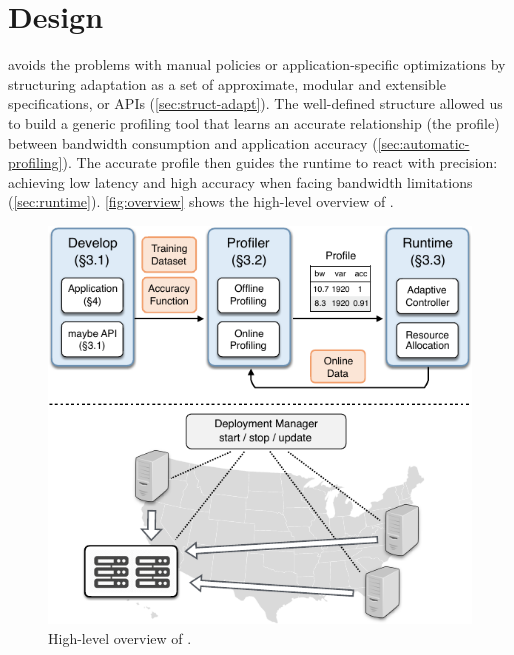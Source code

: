\section{\sysname{} Design}
\label{sec:system}

\sysname{} avoids the problems with manual policies or application-specific
optimizations by structuring adaptation as a set of approximate, modular and
extensible specifications, or APIs (\autoref{sec:struct-adapt}). The
well-defined structure allowed us to build a generic profiling tool that learns
an accurate relationship (the profile) between bandwidth consumption and
application accuracy (\autoref{sec:automatic-profiling}). The accurate profile
then guides the runtime to react with precision: achieving low latency and high
accuracy when facing bandwidth limitations
(\autoref{sec:runtime}). \autoref{fig:overview} shows the high-level overview of
\sysname{}.

\begin{figure}
  \centering
  \includegraphics[width=0.8\linewidth]{figures/system.pdf}
  \caption{High-level overview of \sysname{}. }
  \label{fig:overview}
\end{figure}





